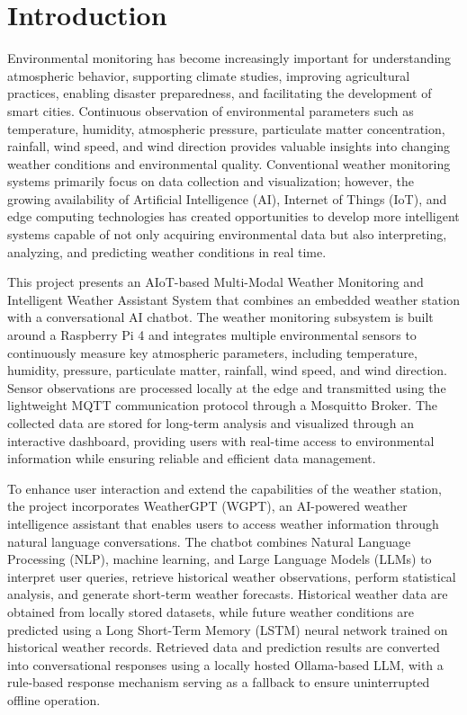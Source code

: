 \documentclass[12pt]{article}
\begin{document}
\section{Introduction}
Environmental monitoring has become increasingly important for understanding atmospheric behavior, supporting climate studies, improving agricultural practices, enabling disaster preparedness, and facilitating the development of smart cities. Continuous observation of environmental parameters such as temperature, humidity, atmospheric pressure, particulate matter concentration, rainfall, wind speed, and wind direction provides valuable insights into changing weather conditions and environmental quality. Conventional weather monitoring systems primarily focus on data collection and visualization; however, the growing availability of Artificial Intelligence (AI), Internet of Things (IoT), and edge computing technologies has created opportunities to develop more intelligent systems capable of not only acquiring environmental data but also interpreting, analyzing, and predicting weather conditions in real time.

This project presents an AIoT-based Multi-Modal Weather Monitoring and Intelligent Weather Assistant System that combines an embedded weather station with a conversational AI chatbot. The weather monitoring subsystem is built around a Raspberry Pi 4 and integrates multiple environmental sensors to continuously measure key atmospheric parameters, including temperature, humidity, pressure, particulate matter, rainfall, wind speed, and wind direction. Sensor observations are processed locally at the edge and transmitted using the lightweight MQTT communication protocol through a Mosquitto Broker. The collected data are stored for long-term analysis and visualized through an interactive dashboard, providing users with real-time access to environmental information while ensuring reliable and efficient data management.

To enhance user interaction and extend the capabilities of the weather station, the project incorporates WeatherGPT (WGPT), an AI-powered weather intelligence assistant that enables users to access weather information through natural language conversations. The chatbot combines Natural Language Processing (NLP), machine learning, and Large Language Models (LLMs) to interpret user queries, retrieve historical weather observations, perform statistical analysis, and generate short-term weather forecasts. Historical weather data are obtained from locally stored datasets, while future weather conditions are predicted using a Long Short-Term Memory (LSTM) neural network trained on historical weather records. Retrieved data and prediction results are converted into conversational responses using a locally hosted Ollama-based LLM, with a rule-based response mechanism serving as a fallback to ensure uninterrupted offline operation.
\end{document}
